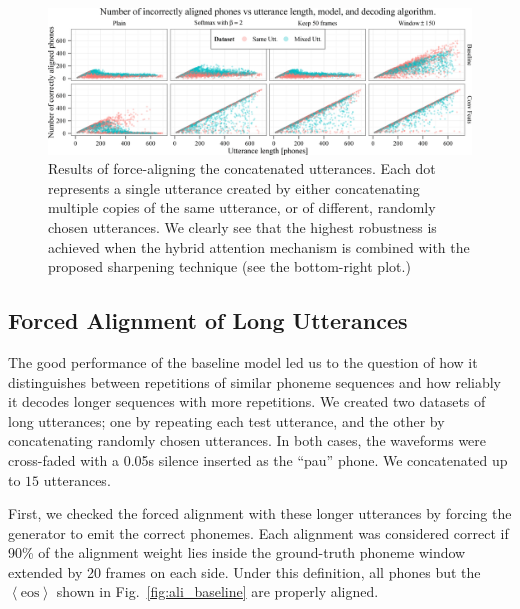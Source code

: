 \documentclass{article} %
\begin{document}
\begin{figure}[t]
  \centering
  \vspace{.1cm} %
  \includegraphics[width=\textwidth]{alis_corrected.png}
  \caption[Results of force-aligning of long utterances with corrections.]{
    Results of force-aligning the concatenated utterances. Each dot
    represents a single utterance created by either concatenating
    multiple copies of the same utterance, or of different, randomly
    chosen utterances. 
    We clearly see that the highest robustness is achieved
    when the hybrid attention mechanism is combined with the proposed sharpening
    technique (see the bottom-right plot.)
  }
  \label{fig:forced_ali_corrected}

  \vspace{-4mm}
\end{figure}

\subsection{Forced Alignment of Long Utterances}

The good performance of the baseline model led us to the question of how it
distinguishes between repetitions of similar phoneme sequences and how reliably
it decodes longer sequences with more repetitions. We created two datasets of
long utterances; one by repeating each test utterance, and the other by
concatenating randomly chosen utterances. In both cases, the waveforms were
cross-faded with a 0.05s silence inserted as the ``pau'' phone. We concatenated
up to $15$ utterances.

First, we checked the forced alignment with these longer utterances by forcing
the generator to emit the correct phonemes. Each alignment was considered
correct if 90\% of the alignment weight lies inside the ground-truth phoneme
window extended by 20 frames on each side. Under this definition, all
phones but the
$\left<\text{eos}\right>$ shown in Fig.~\ref{fig:ali_baseline} are properly
aligned.
\end{document}
